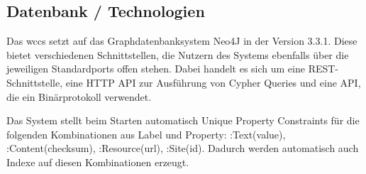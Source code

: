 \subsection{Datenbank / Technologien}
    \label{section:solutionDetailsPersistenceDatabse}
    Das \gls{wccs} setzt auf das Graphdatenbanksystem Neo4J in der Version 3.3.1.
    Diese bietet verschiedenen Schnittstellen, die Nutzern des Systems ebenfalls über die jeweiligen Standardports offen stehen.
    Dabei handelt es sich um eine REST-Schnittstelle, %
    eine HTTP API zur Ausführung von Cypher Queries %
    und eine API, die ein Binärprotokoll verwendet. %

    Das System stellt beim Starten automatisch Unique Property Constraints %
    für die folgenden Kombinationen aus Label und Property:
    :Text(value), :Content(checksum), :Resource(url), :Site(id).
    Dadurch werden automatisch auch Indexe auf diesen Kombinationen erzeugt.